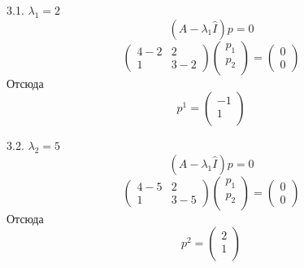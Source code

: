 \documentclass[10pt]{report}
\begin{document}
3.1. $\lambda_1=2$\\
\[(A-\lambda_1 \hat{I})p=0\]
\[\left(
\begin{array}{cc}
4-2 & 2\\
1 & 3-2
\end{array}
\right)
\left(
\begin{array}{cc}
p_1\\
p_2\\
\end{array}
\right)=
\left(
\begin{array}{c}
0\\
0
\end{array}
\right)
\]
Отсюда
\[p^1=
\left(
\begin{array}{cc}
-1\\
1\\
\end{array}
\right)
\]

3.2. $\lambda_2=5$\\
\[(A-\lambda_1 \hat{I})p=0\]
\[\left(
\begin{array}{cc}
4-5 & 2\\
1 & 3-5
\end{array}
\right)
\left(
\begin{array}{cc}
p_1\\
p_2\\
\end{array}
\right)=
\left(
\begin{array}{c}
0\\
0
\end{array}
\right)
\]
Отсюда
\[p^2=
\left(
\begin{array}{cc}
2\\
1\\
\end{array}
\right)
\]
\end{document}

